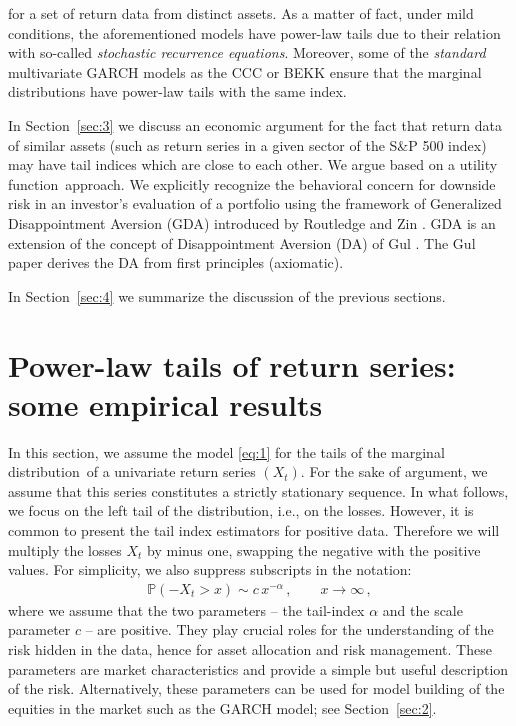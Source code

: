 \documentclass[11pt,a4]{amsart}
\newcommand{\sre}{stochastic recurrence equation}
\newcommand{\beam}{\begin{eqnarray}}
\newcommand{\eeam}{\end{eqnarray}\noindent}
\newcommand{\xto}{x\to\infty}
\newcommand{\fct}{function}
\newcommand{\ds}{distribution}
\newcommand{\seq}{sequence}
\renewcommand{\P }{{\mathbb P}}
\newcommand{\1}{{\mathbf 1}}
\begin{document}
for a set of return data from distinct assets. As a matter of fact, under mild conditions, the aforementioned models
have power-law tails due to their relation with so-called {\em \sre s}. Moreover, some of the {\em standard} multivariate 
GARCH models as the CCC or BEKK ensure that the marginal \ds s have power-law tails with the same index.
\par
In Section~\ref{sec:3} we discuss an economic argument for the fact that return data of similar assets
(such as return series in a given sector of the S\&P 500 index) may have tail indices which are close to each other.
We argue based on a  utility \fct\ approach. We explicitly recognize the behavioral
concern for downside risk in an investor's evaluation of a portfolio
using the framework of Generalized Disappointment Aversion (GDA)
introduced by Routledge and Zin \cite{routledge2010generalized}. GDA
is an extension of the concept of Disappointment Aversion (DA) of Gul \cite{gul:1991}. The Gul paper derives the DA from first principles (axiomatic).
\par 
In Section~\ref{sec:4} we summarize the discussion of the previous
sections. 




\section{Power-law tails of return series: some empirical results}\label{sec:1}\setcounter{equation}{0}
In this section, we assume the model \eqref{eq:1} for the tails of the marginal
\ds\ of a univariate return series $(X_t)$. For the sake of argument, we assume
that this series constitutes a strictly stationary \seq . In what follows, we focus
on the left tail of the \ds , i.e., on the losses. 
However, it is common to present the tail index estimators
for positive data. Therefore we will multiply the losses $X_t$ by minus one, swapping the negative with the positive values.
For simplicity, we also suppress subscripts in the notation:
\beam\label{eq:1a}
\P(-X_t>x)\sim c\,x^{-\alpha}\,,\qquad \xto\,,
\eeam
where we assume that the two parameters -- the tail-index  $\alpha$ and the scale parameter
$c$ -- are positive. They play crucial roles for the understanding of the risk hidden in the data, hence 
for asset allocation and risk management. These parameters are market characteristics  and provide a simple but 
useful description of the risk. Alternatively, these parameters can be
used for model building of the equities in the market such as the GARCH model; see Section~\ref{sec:2}.
\end{document}
